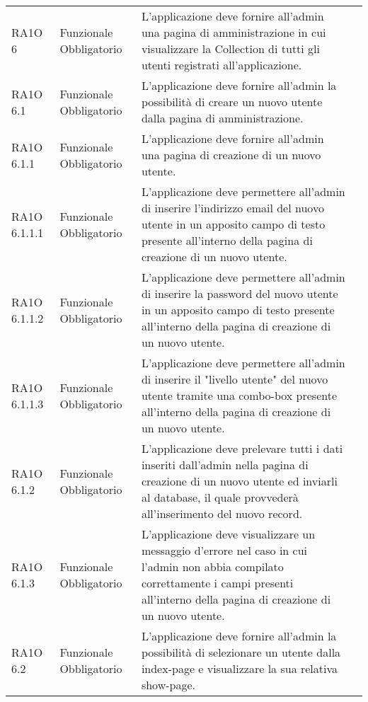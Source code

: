 \begin{center}
\begin{longtable}{ | p{2cm} | p{2cm} | p{5cm} | p{2cm} |}
 &  \\ \hline      
        RA1O 6 & Funzionale \newline  Obbligatorio  & L'applicazione deve fornire all'admin una pagina di amministrazione in cui visualizzare la Collection di tutti gli utenti registrati all'applicazione.
 &  \\ \hline      
        RA1O 6.1  & Funzionale \newline  Obbligatorio  & L'applicazione deve fornire all'admin la possibilità  di creare un nuovo utente dalla pagina di amministrazione. &  \\ \hline      
        RA1O 6.1.1  & Funzionale \newline  Obbligatorio  & L'applicazione deve fornire all'admin una pagina di creazione di un nuovo utente. &  \\ \hline      
        RA1O 6.1.1.1  & Funzionale \newline  Obbligatorio  & L'applicazione deve permettere all'admin di inserire l'indirizzo email del nuovo utente in un apposito campo di testo presente all'interno della pagina di creazione di un nuovo utente.
 &  \\ \hline      
        RA1O 6.1.1.2 & Funzionale \newline  Obbligatorio  & L'applicazione deve permettere all'admin di inserire la password del nuovo utente in un apposito campo di testo presente all'interno della pagina di creazione di un nuovo utente. &  \\ \hline      
        RA1O 6.1.1.3  & Funzionale \newline  Obbligatorio  & L'applicazione deve permettere all'admin di inserire il "livello utente" del nuovo utente tramite una combo-box presente all'interno della pagina di creazione di un nuovo utente. &  \\ \hline      
        RA1O 6.1.2  & Funzionale \newline  Obbligatorio  & L'applicazione deve prelevare tutti i dati inseriti dall'admin nella pagina di creazione di un nuovo utente ed inviarli al database, il quale provvederà  all'inserimento del nuovo record.
 &  \\ \hline      
        RA1O 6.1.3  & Funzionale \newline  Obbligatorio  & L'applicazione deve visualizzare un messaggio d'errore nel caso in cui l'admin non abbia compilato correttamente i campi presenti all'interno della pagina di creazione di un nuovo utente.
 &  \\ \hline      
        RA1O 6.2  & Funzionale \newline  Obbligatorio  & L'applicazione deve fornire all'admin la possibilità di selezionare un utente dalla index-page e visualizzare la sua relativa show-page.

\end{longtable}
\end{center}
